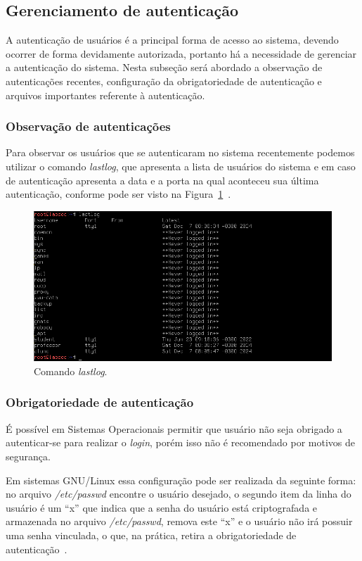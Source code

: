 \documentclass[
    12pt,				%
    oneside,   	        %
    a4paper,			%
    english,			%
    french,				%
    spanish,			%
    brazil,				%
    ]{pacotes/abntex2}
\begin{document}
\subsection{Gerenciamento de autenticação}
A autenticação de usuários é a principal forma de acesso ao sistema, devendo ocorrer de forma devidamente autorizada, portanto há a necessidade de gerenciar a autenticação do sistema. Nesta subseção será abordado a observação de autenticações recentes, configuração da obrigatoriedade de autenticação e arquivos importantes referente à autenticação.

\subsubsection{Observação de autenticações}
Para observar os usuários que se autenticaram no sistema recentemente podemos utilizar o comando \textit{lastlog}, que apresenta a lista de usuários do sistema e em caso de autenticação apresenta a data e a porta na qual aconteceu sua última autenticação, conforme pode ser visto na Figura~\ref{fig:lastlogs}~\cite{negus2012}.

\begin{figure}[H]
  \centering
  \includegraphics[scale=0.7]{figuras/lastlog.png}
  \caption{Comando \textit{lastlog}.}
  \label{fig:lastlogs}
\end{figure}

\subsubsection{Obrigatoriedade de autenticação}
\label{subsubsec:passwd_root}
É possível em Sistemas Operacionais permitir que usuário não seja obrigado a autenticar-se para realizar o \textit{login}, porém isso não é recomendado por motivos de segurança.

Em sistemas GNU/Linux essa configuração pode ser realizada da seguinte forma: no arquivo \textit{/etc/passwd} encontre o usuário desejado, o segundo item da linha do usuário é um ``x'' que indica que a senha do usuário está criptografada e armazenada no arquivo \textit{/etc/passwd}, remova este ``x'' e o usuário não irá possuir uma senha vinculada, o que, na prática, retira a obrigatoriedade de autenticação~\cite{guiafocaSegurança}.
\end{document}
